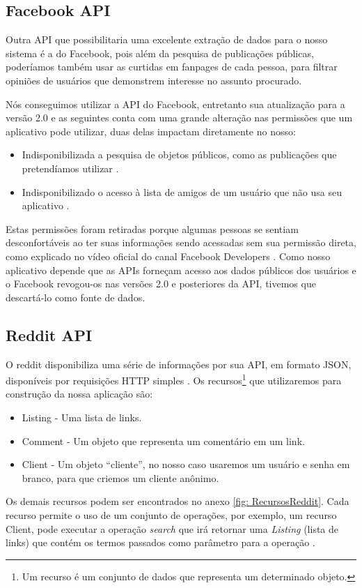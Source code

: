     \subsection{Facebook API}
    \label{subsec: FacebookAPI}
Outra API que possibilitaria uma excelente extração de dados para o nosso sistema é a do Facebook, pois além da pesquisa de publicações públicas, poderíamos também usar as curtidas em fanpages de cada pessoa, para filtrar opiniões de usuários que demonstrem interesse no assunto procurado.

Nós conseguimos utilizar a API do Facebook, entretanto sua atualização para a versão 2.0 e as seguintes conta com uma grande alteração nas permissões que um aplicativo pode utilizar, duas delas impactam diretamente no nosso:
\begin{itemize}
  \item Indisponibilizada a pesquisa de objetos públicos, como as publicações que pretendíamos utilizar \cite{FacebookDevs}.
  \item Indisponibilizado o acesso à lista de amigos de um usuário que não usa seu aplicativo \cite{FacebookDevs}.
\end{itemize}

Estas permissões foram retiradas porque algumas pessoas se sentiam desconfortáveis ao ter suas informações sendo acessadas sem sua permissão direta, como explicado no vídeo oficial do canal Facebook Developers \cite{FbAPIV2Video}.
Como nosso aplicativo depende que as APIs forneçam acesso aos dados públicos dos usuários e o Facebook revogou-os nas versões 2.0 e posteriores da API, tivemos que descartá-lo como fonte de dados.

    \subsection{Reddit API}
    \label{subsec: RedditAPI}
O reddit disponibiliza uma série de informações por sua API, em formato JSON, disponíveis por requisições HTTP simples \cite{RedditAPIWordpress}.
Os recursos\footnote{Um recurso é um conjunto de dados que representa um determinado objeto.} que utilizaremos para construção da nossa aplicação são:
\begin{itemize}
    \item Listing - Uma lista de links.
    \item Comment - Um objeto que representa um comentário em um link.
    \item Client - Um objeto “cliente”, no nosso caso usaremos um usuário e senha em branco, para que criemos um cliente anônimo.
\end{itemize}
Os demais recursos podem ser encontrados no anexo \ref{fig: RecursosReddit}.
Cada recurso permite o uso de um conjunto de operações, por exemplo, um recurso Client, pode executar a operação \textit{search} que irá retornar uma \textit{Listing} (lista de links) que contém os termos passados como parâmetro para a operação \cite{RedditAPISearch}.

